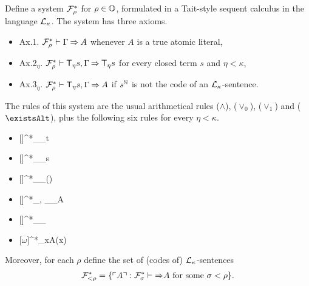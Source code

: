 \documentclass[UKenglish,cleveref,DIV=12]{scrartcl}
\let\forall\forallAlt
\let\exists\existsAlt
\theoremstyle{definition}
\theoremstyle{definition}
\begin{document}
Define a system $\mathcal{F}^*_\rho$ for $\rho\in\mathbb{O}$, formulated in a Tait-style
sequent calculus in the language $\mathcal{L}_\kappa$. The system has three axioms.
\begin{itemize}
 \item Ax.1. $\mathcal{F}^*_\rho\vdash\Gamma \mathbin\Rightarrow A$ whenever $A$ is a true atomic literal,
 \item Ax.2$_\eta$. $\mathcal{F}^*_\rho\vdash \mathsf{T}_\eta s , \Gamma \mathbin\Rightarrow \mathsf{T}_\eta s$ for every closed term $s$ and $\eta<\kappa$,
 \item Ax.3$_\eta$. $\mathcal{F}^*_\rho\vdash \mathsf{T}_\eta s , \Gamma\mathbin\Rightarrow A$ if $s^\mathbb N$ is not the code of an $\mathcal{L}_\kappa$-sentence.
\end{itemize}
The rules of this system are the usual arithmetical rules ($\land$), ($\lor_0$), ($\lor_1$) and ($\exists$), plus the following six rules for every $\eta<\kappa$.
\begin{itemize}
\item %
	\begin{prooftree}
	[\Imp{\eta}]{\FF^*_\rho\proves \Gamma \sa \T_\eta t}
  \end{prooftree}
\item %
	\begin{prooftree}
	\hypo{\xi < \beta}
	[\Del{\eta}]{\FF^*_\rho\proves \Gamma \sa \T_\eta s}
  \end{prooftree}
\item %
	\begin{prooftree}
	\hypo{\xi < \eta }
	[\Rep{\eta}]{\FF^*_\rho\proves\Gamma \sa \T_\eta ()}
  \end{prooftree}
\item %
	\begin{prooftree}
		\hypo{\sigma < \rho |_\eta }
	[\Nec{\eta}]{\FF^*_\rho\proves \Delta , \T_\eta \gn\Gamma \sa \T_\eta \gn A }
  \end{prooftree}
\item %
	\begin{prooftree}
	[\Uni{\eta}]{\FF^*_\rho\proves \Gamma \sa \T_\eta \gn{\forall xA(x)} }
  \end{prooftree}
\item %
	\begin{prooftree}
	[$\omega$]{\FF^*_\rho\proves \Gamma \sa \forall xA(x)}
  \end{prooftree}
\end{itemize}
Moreover, for each $\rho$ define the set of (codes of) $\mathcal{L}_\kappa$-sentences
\begin{align*}
	\mathcal{F}^*_{<\rho}=\{\ulcorner{A}\urcorner:\mathcal{F}^*_\sigma\vdash  \mathbin\Rightarrow A\text{ for some $\sigma<\rho$}\}.
\end{align*}
\end{document}
